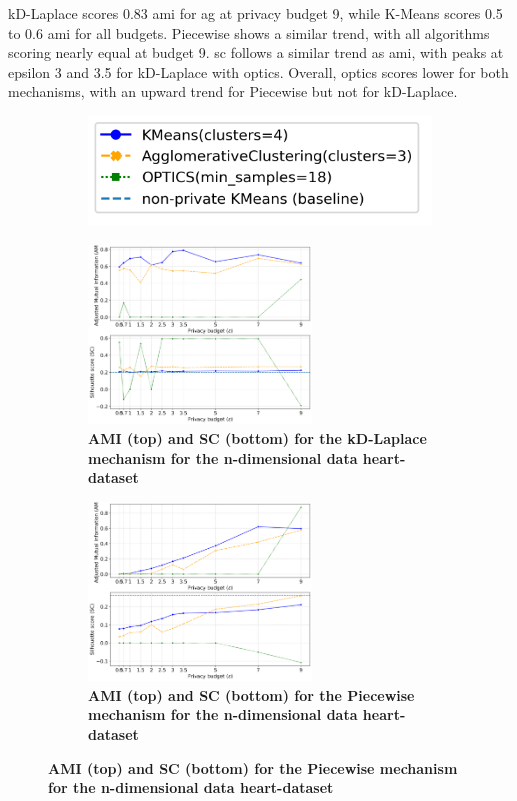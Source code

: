 kD-Laplace scores 0.83 \gls{ami} for \gls{ag} at privacy budget 9, while K-Means scores 0.5 to 0.6 \gls{ami} for all budgets.
Piecewise shows a similar trend, with all algorithms scoring nearly equal at budget 9. \gls{sc} follows a similar trend as \gls{ami}, with peaks at epsilon 3 and 3.5 for kD-Laplace with \gls{optics}. Overall, \gls{optics} scores lower for both mechanisms, with an upward trend for Piecewise but not for kD-Laplace.
\newpage
\begin{figure}[H]
      \centering
      \begin{subfigure}{0.30\textwidth}
            \includegraphics[width=\textwidth]{Results/kd-laplace/kd-Laplace/heart-dataset/legend_9.png}
      \end{subfigure}
      \begin{subfigure}{1\textwidth}
            \caption{\textbf{AMI (top) and SC (bottom) for the kD-Laplace mechanism for the n-dimensional data heart-dataset}}
            \centering
            \includegraphics[width=0.65\textwidth]{Results/kd-laplace/kd-Laplace/heart-dataset/ami-and-sc_9_dimensions.png}
            \centering
      \end{subfigure}
      \begin{subfigure}{1\textwidth}
            \caption{\textbf{AMI (top) and SC (bottom) for the Piecewise mechanism for the n-dimensional data heart-dataset}}
            \centering
            \includegraphics[width=0.65\textwidth]{Results/kd-laplace/piecewise/heart-dataset/ami-and-sc_9_dimensions.png}

\end{subfigure}
\end{figure}
